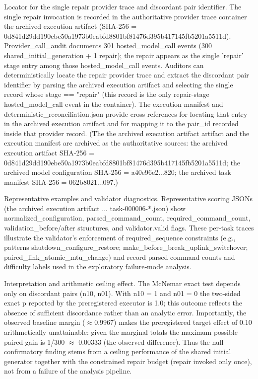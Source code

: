 \documentclass[conference]{IEEEtran}
\begin{document}
Locator for the single repair provider trace and discordant pair identifier. The single repair invocation is recorded in the authoritative provider trace container the archived execution artifact (SHA‑256 = 0d841d29\allowbreak{}dd190ebe\allowbreak{}50a1973b\allowbreak{}0eabfd88\allowbreak{}01bf8147\allowbreak{}6d395b41\allowbreak{}7145fb52\allowbreak{}01a5511d). Provider\_call\_audit documents 301 hosted\_model\_call events (300 shared\_initial\_generation + 1 repair); the repair appears as the single 'repair' stage entry among those hosted\_model\_call events. Auditors can deterministically locate the repair provider trace and extract the discordant pair identifier by parsing the archived execution artifact and selecting the single record whose stage == "repair" (this record is the only repair-stage hosted\_model\_call event in the container). The execution manifest and deterministic\_reconciliation.json provide cross‑references for locating that entry in the archived execution artifact and for mapping it to the pair\_id recorded inside that provider record. (The the archived execution artifact artifact and the execution manifest are archived as the authoritative sources: the archived execution artifact SHA‑256 = 0d841d29\allowbreak{}dd190ebe\allowbreak{}50a1973b\allowbreak{}0eabfd88\allowbreak{}01bf8147\allowbreak{}6d395b41\allowbreak{}7145fb52\allowbreak{}01a5511d; the archived model configuration SHA‑256 = a40e96e2...820; the archived task manifest SHA‑256 = 062b8021...097.)

Representative examples and validator diagnostics. Representative scoring JSONs (the archived execution artifact ... task-000006-*.json) show normalized\_configuration, parsed\_command\_count, required\_command\_count, validation\_before/after structures, and validator.valid flags. These per‑task traces illustrate the validator's enforcement of required\_sequence constraints (e.g., patterns shutdown\_configure\_restore; make\_before\_break\_uplink\_switchover; paired\_link\_atomic\_mtu\_change) and record parsed command counts and difficulty labels used in the exploratory failure‑mode analysis.

Interpretation and arithmetic ceiling effect. The McNemar exact test depends only on discordant pairs (n10, n01). With n10 = 1 and n01 = 0 the two‑sided exact p reported by the preregistered executor is 1.0; this outcome reflects the absence of sufficient discordance rather than an analytic error. Importantly, the observed baseline margin (\ensuremath{\approx}0.9967) makes the preregistered target effect of 0.10 arithmetically unattainable: given the marginal totals the maximum possible paired gain is 1/300 \ensuremath{\approx} 0.00333 (the observed difference). Thus the null confirmatory finding stems from a ceiling performance of the shared initial generator together with the constrained repair budget (repair invoked only once), not from a failure of the analysis pipeline.
\end{document}
